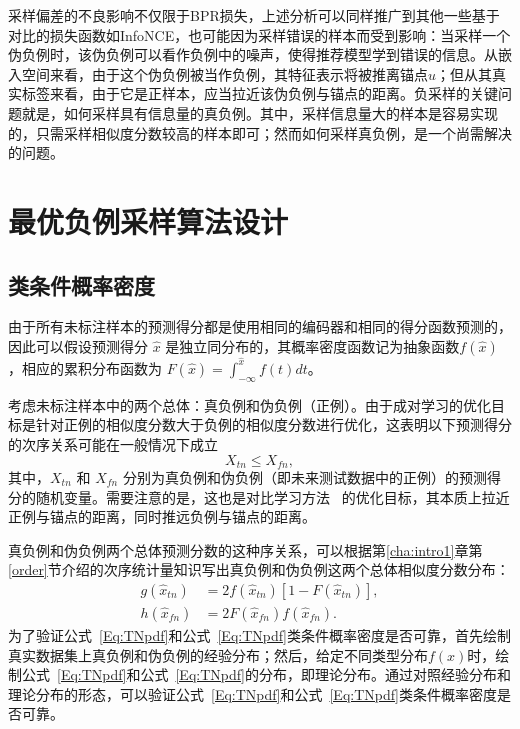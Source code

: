 采样偏差的不良影响不仅限于BPR损失，上述分析可以同样推广到其他一些基于对比的损失函数如InfoNCE，也可能因为采样错误的样本而受到影响：当采样一个伪负例时，该伪负例可以看作负例中的噪声，使得推荐模型学到错误的信息。从嵌入空间来看，由于这个伪负例被当作负例，其特征表示将被推离锚点$u$；但从其真实标签来看，由于它是正样本，应当拉近该伪负例与锚点的距离。负采样的关键问题就是，如何采样具有信息量的真负例。其中，采样信息量大的样本是容易实现的，只需采样相似度分数较高的样本即可；然而如何采样真负例，是一个尚需解决的问题。

\section{最优负例采样算法设计}
\subsection{类条件概率密度} \label{Sec:Dis}
由于所有未标注样本的预测得分都是使用相同的编码器和相同的得分函数预测的，因此可以假设预测得分 $\hat{x}$ 是独立同分布的，其概率密度函数记为抽象函数$f(\hat{x})$，相应的累积分布函数为 $F(\hat{x}) =\int_{- \infty }^{\hat{x}} f(t)dt$。

考虑未标注样本中的两个总体：真负例和伪负例（正例）。由于成对学习的优化目标是针对正例的相似度分数大于负例的相似度分数进行优化，这表明以下预测得分的次序关系可能在一般情况下成立
\begin{equation}\label{Eq:OrderRelation}
	X_{tn} \leq X_{fn},
\end{equation}
其中，$X_{tn}$ 和 $X_{fn}$ 分别为真负例和伪负例（即未来测试数据中的正例）的预测得分的随机变量。需要注意的是，这也是对比学习方法~\cite{gutmann:2012:JMLR,Oord:2018:arxiv,Gutmann:2010:ICAIS} 的优化目标，其本质上拉近正例与锚点的距离，同时推远负例与锚点的距离\cite{Wang:2020:ICML,Xu:2022:arxiv,Liu:2021:TKDE}。

真负例和伪负例两个总体预测分数的这种序关系，可以根据第\ref{cha:intro1}章第\ref{order}节介绍的次序统计量知识写出真负例和伪负例这两个总体相似度分数分布：
\begin{align}
g(\hat{x}_{tn}) &= 2 f(\hat{x}_{tn}) [1 - F(\hat{x}_{tn})]\label{Eq:TNpdf},\\
h(\hat{x}_{fn}) &= 2 F(\hat{x}_{fn}) f(\hat{x}_{fn}).	\label{Eq:FNpdf}
\end{align}
为了验证公式~\eqref{Eq:TNpdf}和公式~\eqref{Eq:TNpdf}类条件概率密度是否可靠，首先绘制真实数据集上真负例和伪负例的经验分布；然后，给定不同类型分布$f(x)$时，绘制公式~\eqref{Eq:TNpdf}和公式~\eqref{Eq:TNpdf}的分布，即理论分布。通过对照经验分布和理论分布的形态，可以验证公式~\eqref{Eq:TNpdf}和公式~\eqref{Eq:TNpdf}类条件概率密度是否可靠。

